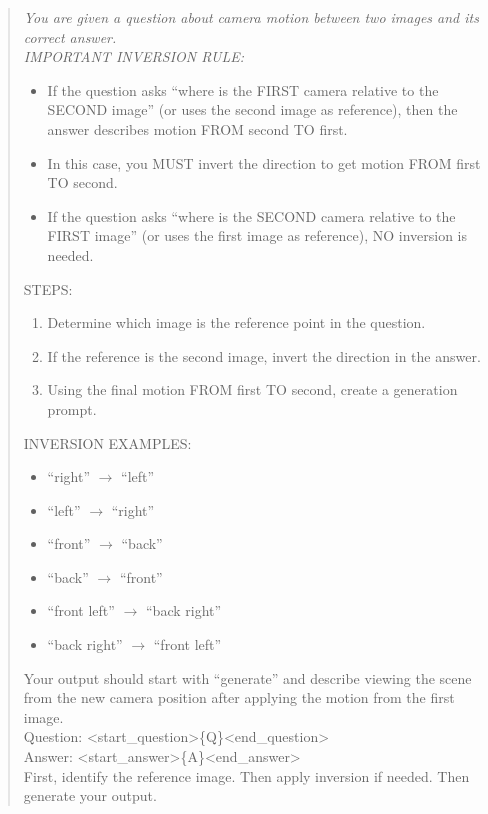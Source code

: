 \documentclass{llmxive}
\begin{document}
\begin{quote}
\itshape
You are given a question about camera motion between two images and its correct answer.\\[4pt]
IMPORTANT INVERSION RULE:
\begin{itemize}
    \item If the question asks ``where is the FIRST camera relative to the SECOND image'' (or uses the second image as reference), then the answer describes motion FROM second TO first.
    \item In this case, you MUST invert the direction to get motion FROM first TO second.
    \item If the question asks ``where is the SECOND camera relative to the FIRST image'' (or uses the first image as reference), NO inversion is needed.
\end{itemize}
STEPS:
\begin{enumerate}
    \item Determine which image is the reference point in the question.
    \item If the reference is the second image, invert the direction in the answer.
    \item Using the final motion FROM first TO second, create a generation prompt.
\end{enumerate}
INVERSION EXAMPLES:
\begin{itemize}
    \item ``right'' $\to$ ``left''
    \item ``left'' $\to$ ``right''
    \item ``front'' $\to$ ``back''
    \item ``back'' $\to$ ``front''
    \item ``front left'' $\to$ ``back right''
    \item ``back right'' $\to$ ``front left''
\end{itemize}
Your output should start with ``generate'' and describe viewing the scene from the new camera position after applying the motion from the first image.\\[4pt]
Question: \textless start\_question\textgreater\{Q\}\textless end\_question\textgreater\\
Answer: \textless start\_answer\textgreater\{A\}\textless end\_answer\textgreater\\[4pt]
First, identify the reference image. Then apply inversion if needed. Then generate your output.
\end{quote}
 
\end{document}
